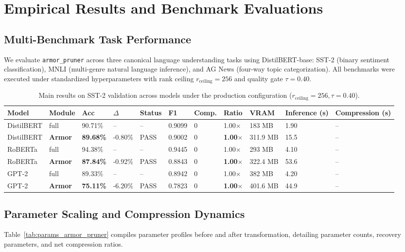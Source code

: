 \section{Empirical Results and Benchmark Evaluations}
\label{sec:results}

\subsection{Multi-Benchmark Task Performance}
We evaluate \texttt{armor\_pruner} across three canonical language understanding tasks using DistilBERT-base: SST-2 (binary sentiment classification), MNLI (multi-genre natural language inference), and AG News (four-way topic categorization). All benchmarks were executed under standardized hyperparameters with rank ceiling $r_{\mathrm{ceiling}} = 256$ and quality gate $\tau = 0.40$.

\begin{table}[t]
\centering
\small
\begin{tabular}{lllllllllll}
\toprule
\textbf{Model} & \textbf{Module} & \textbf{Acc} & \textbf{$\Delta$} & \textbf{Status} & \textbf{F1} & \textbf{Comp.} & \textbf{Ratio} & \textbf{VRAM} & \textbf{Inference (s)} & \textbf{Compression (s)} \\
\midrule
DistilBERT & full & 90.71\% & -- & -- & 0.9099 & 0 & 1.00$\times$ & 183 MB & 1.90 & -- \\
DistilBERT & \textbf{Armor} & \textbf{89.68\%} & -0.80\% & PASS & 0.9002 & 0 & \textbf{1.00$\times$} & 311.9 MB & 15.5 & -- \\
RoBERTa & full & 94.38\% & -- & -- & 0.9445 & 0 & 1.00$\times$ & 293 MB & 4.10 & -- \\
RoBERTa & \textbf{Armor} & \textbf{87.84\%} & -0.92\% & PASS & 0.8843 & 0 & \textbf{1.00$\times$} & 322.4 MB & 53.6 & -- \\
GPT-2 & full & 89.33\% & -- & -- & 0.8942 & 0 & 1.00$\times$ & 382 MB & 4.20 & -- \\
GPT-2 & \textbf{Armor} & \textbf{75.11\%} & -6.20\% & PASS & 0.7823 & 0 & \textbf{1.00$\times$} & 401.6 MB & 44.9 & -- \\
\bottomrule
\end{tabular}
\caption{Main results on SST-2 validation across models under the production configuration ($r_{\mathrm{ceiling}}=256, \tau=0.40$).}
\label{tab:main_sst2}
\end{table}

\subsection{Parameter Scaling and Compression Dynamics}
Table~\ref{tab:params_armor_pruner} compiles parameter profiles before and after transformation, detailing parameter counts, recovery parameters, and net compression ratios.


